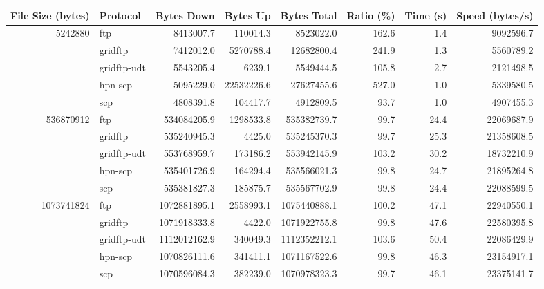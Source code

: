 \documentclass{sig-alternate-05-2015}
\begin{document}
\begin{table}[t]
\centering
	\begin{tabular}{rlrrrrrr}
	\toprule
	File Size (bytes) &     Protocol &   Bytes Down &   Bytes Up &  Bytes Total &  Ratio (\%) &  Time (s) &  Speed (bytes/s) \\
	\midrule
	   5242880 &          ftp &    8413007.7 &   110014.3 &    8523022.0 &      162.6 &       1.4 &        9092596.7 \\
	           &      gridftp &    7412012.0 &  5270788.4 &   12682800.4 &      241.9 &       1.3 &        5560789.2 \\
	           &  gridftp-udt &    5543205.4 &     6239.1 &    5549444.5 &      105.8 &       2.7 &        2121498.5 \\
	           &      hpn-scp &    5095229.0 & 22532226.6 &   27627455.6 &      527.0 &       1.0 &        5339580.5 \\
	           &          scp &    4808391.8 &   104417.7 &    4912809.5 &       93.7 &       1.0 &        4907455.3 \\
	\midrule
	 536870912 &          ftp &  534084205.9 &  1298533.8 &  535382739.7 &       99.7 &      24.4 &       22069687.9 \\
	           &      gridftp &  535240945.3 &     4425.0 &  535245370.3 &       99.7 &      25.3 &       21358608.5 \\
	           &  gridftp-udt &  553768959.7 &   173186.2 &  553942145.9 &      103.2 &      30.2 &       18732210.9 \\
	           &      hpn-scp &  535401726.9 &   164294.4 &  535566021.3 &       99.8 &      24.7 &       21895264.8 \\
	           &          scp &  535381827.3 &   185875.7 &  535567702.9 &       99.8 &      24.4 &       22088599.5 \\
	\midrule
	1073741824 &          ftp & 1072881895.1 &  2558993.1 & 1075440888.1 &      100.2 &      47.1 &       22940550.1 \\
	           &      gridftp & 1071918333.8 &     4422.0 & 1071922755.8 &       99.8 &      47.6 &       22580395.8 \\
	           &  gridftp-udt & 1112012162.9 &   340049.3 & 1112352212.1 &      103.6 &      50.4 &       22086429.9 \\
	           &      hpn-scp & 1070826111.6 &   341411.1 & 1071167522.6 &       99.8 &      46.3 &       23154917.1 \\
	           &          scp & 1070596084.3 &   382239.0 & 1070978323.3 &       99.7 &      46.1 &       23375141.7 \\

\end{tabular}
\end{table}
\end{document}
